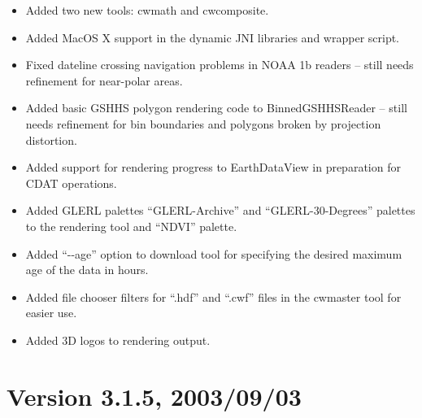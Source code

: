\begin{itemize}

  \item Added two new tools: cwmath and cwcomposite.

  \item Added MacOS X support in the dynamic JNI libraries and wrapper
  script.

  \item Fixed dateline crossing navigation problems in NOAA 1b readers
  -- still needs refinement for near-polar areas.

  \item Added basic GSHHS polygon rendering code to BinnedGSHHSReader
  -- still needs refinement for bin boundaries and polygons broken by
  projection distortion.

  \item Added support for rendering progress to EarthDataView in
  preparation for CDAT operations.

  \item Added GLERL palettes ``GLERL-Archive'' and
  ``GLERL-30-Degrees'' palettes to the rendering tool and ``NDVI''
  palette.

  \item Added ``-{-}age'' option to download tool for specifying the
  desired maximum age of the data in hours.

  \item Added file chooser filters for ``.hdf'' and ``.cwf'' files in
  the cwmaster tool for easier use.

  \item Added 3D logos to rendering output.

\end{itemize}




\section*{Version 3.1.5, 2003/09/03}

